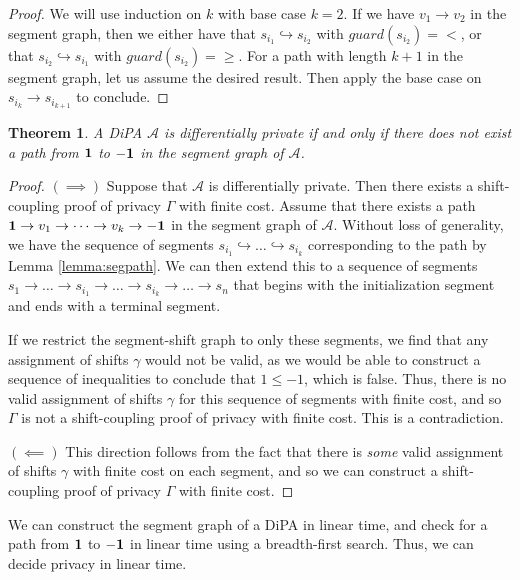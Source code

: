 \documentclass[12pt]{article}
\newtheorem{thm}{Theorem}[section]
\theoremstyle{definition}
\begin{document}
\begin{proof}
    We will use induction on $k$ with base case $k = 2$. If we have $v_1 \to v_2$ in the segment  graph, then we either have that $s_{i_1} \hookrightarrow s_{i_2}$ with $guard(s_{i_2}) = <$, or that $s_{i_2} \hookrightarrow s_{i_1}$ with $guard(s_{i_2}) = \geq$. For a path with length $k + 1$ in the segment  graph, let us assume the desired result. Then apply the base case on $s_{i_{k}} \to s_{i_{k + 1}}$ to conclude. 
\end{proof}

\begin{thm}
    \label{theorem:decide_privacy}
    A DiPA $\mathcal{A}$ is differentially private if and only if there does not exist a path from $\bf 1$ to $\bf -1$ in the segment graph of $\mathcal{A}$.
\end{thm}

\begin{proof}
    $(\implies)$ Suppose that $\mathcal{A}$ is differentially private. Then there exists a shift-coupling proof of privacy $\Gamma$ with finite cost. Assume that there exists a path ${\bf 1} \to v_1 \to \dots \to v_k \to {\bf -1}$ in the segment graph of $\mathcal{A}$. 
    Without loss of generality, we have the sequence of segments $s_{i_1} \hookrightarrow \dots \hookrightarrow s_{i_k}$ corresponding to the path by Lemma \ref{lemma:segpath}. We can then extend this to a sequence of segments $s_1 \to \dots \to s_{i_1} \to \dots \to s_{i_k} \to \dots \to s_n$ that begins with the initialization segment and ends with a terminal segment. 

    If we restrict the segment-shift graph to only these segments, we find that any assignment of shifts $\gamma$ would not be valid, as we would be able to construct a sequence of inequalities to conclude that $1 \leq -1$, which is false. Thus, there is no valid assignment of shifts $\gamma$ for this sequence of segments with finite cost, and so $\Gamma$ is not a shift-coupling proof of privacy with finite cost. This is a contradiction.

    $(\impliedby)$ This direction follows from the fact that there is \textit{some} valid assignment of shifts $\gamma$ with finite cost on each segment, and so we can construct a shift-coupling proof of privacy $\Gamma$ with finite cost.
\end{proof}

We can construct the segment graph of a DiPA in linear time, and check for a path from $\bf 1$ to $\bf -1$ in linear time using a breadth-first search. Thus, we can decide privacy in linear time.
\end{document}
